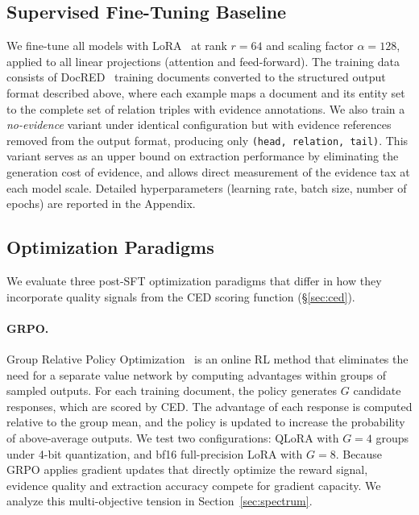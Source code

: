 \subsection{Supervised Fine-Tuning Baseline}
\label{sec:sft}

We fine-tune all models with LoRA~\citep{hu2022lora} at rank $r{=}64$ and scaling factor $\alpha{=}128$, applied to all linear projections (attention and feed-forward). The training data consists of DocRED~\citep{yao2019docred} training documents converted to the structured output format described above, where each example maps a document and its entity set to the complete set of relation triples with evidence annotations. We also train a \emph{no-evidence} variant under identical configuration but with evidence references removed from the output format, producing only \texttt{(head, relation, tail)}. This variant serves as an upper bound on extraction performance by eliminating the generation cost of evidence, and allows direct measurement of the evidence tax at each model scale. Detailed hyperparameters (learning rate, batch size, number of epochs) are reported in the Appendix.


\subsection{Optimization Paradigms}
\label{sec:paradigms}

We evaluate three post-SFT optimization paradigms that differ in how they incorporate quality signals from the CED scoring function (\S\ref{sec:ced}).

\paragraph{GRPO.}
Group Relative Policy Optimization~\citep{shao2024deepseekmath} is an online RL method that eliminates the need for a separate value network by computing advantages within groups of sampled outputs. For each training document, the policy generates $G$ candidate responses, which are scored by CED. The advantage of each response is computed relative to the group mean, and the policy is updated to increase the probability of above-average outputs. We test two configurations: QLoRA with $G{=}4$ groups under 4-bit quantization, and bf16 full-precision LoRA with $G{=}8$. Because GRPO applies gradient updates that directly optimize the reward signal, evidence quality and extraction accuracy compete for gradient capacity. We analyze this multi-objective tension in Section~\ref{sec:spectrum}.

